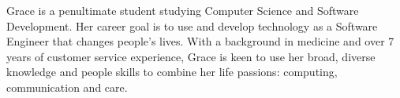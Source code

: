Grace is a penultimate student studying Computer Science and Software Development. Her career goal is to use and develop technology as a Software Engineer that changes people's lives. With a background in medicine and over 7 years of customer service experience, Grace is keen to use her broad, diverse knowledge and people skills to combine her life passions: computing, communication and care. 